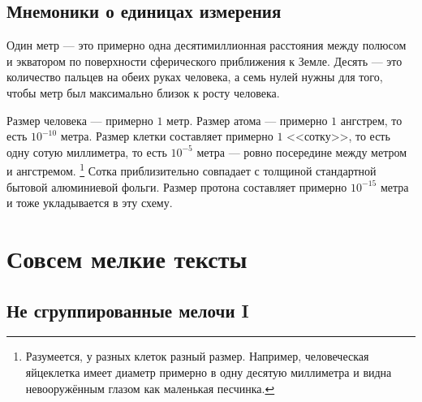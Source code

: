 \documentclass[
	extrafontsizes,
	11pt,
	hyphens,
]{memoir}
\begin{document}
%


\section{Мнемоники о единицах измерения}

\begin{observation}
Один метр --- это примерно одна десятимиллионная расстояния между полюсом и экватором по поверхности сферического приближения к Земле.
Десять --- это количество пальцев на обеих руках человека, а семь нулей нужны для того, чтобы метр был максимально близок к росту человека.
\end{observation}

\begin{observation}
Размер человека --- примерно \(1\) метр.
Размер атома --- примерно \(1\) ангстрем, то есть \(10^{-10}\) метра.
Размер клетки составляет примерно \(1\) <<сотку>>, то есть одну сотую миллиметра, то есть \(10^{-5}\) метра --- ровно посередине между метром и ангстремом.%
\footnote{Разумеется, у разных клеток разный размер. Например, человеческая яйцеклетка имеет диаметр примерно в одну десятую миллиметра и видна невооружённым глазом как маленькая песчинка.}
Сотка приблизительно совпадает с толщиной стандартной бытовой алюминиевой фольги.
Размер протона составляет примерно \(10^{-15}\) метра и тоже укладывается в эту схему.
\end{observation}



\chapter{Совсем мелкие тексты}


\section{Не сгруппированные мелочи I}
\end{document}
